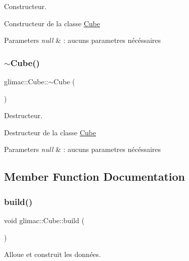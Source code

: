 Constructeur. 

Constructeur de la classe \hyperlink{classglimac_1_1Cube}{Cube}


\begin{DoxyParams}{Parameters}
{\em null} & \+: aucuns parametres nécéssaires \\
\hline
\end{DoxyParams}
\mbox{\label{classglimac_1_1Cube_a52597e45ce6cd2db132f5d198c2bd33b}} 
\subsubsection{\texorpdfstring{$\sim$\+Cube()}{~Cube()}}
{\footnotesize\ttfamily glimac\+::\+Cube\+::$\sim$\+Cube (\begin{DoxyParamCaption}{ }\end{DoxyParamCaption})\hspace{0.3cm}{\ttfamily [inline]}}



Destructeur. 

Destructeur de la classe \hyperlink{classglimac_1_1Cube}{Cube}


\begin{DoxyParams}{Parameters}
{\em null} & \+: aucuns parametres nécéssaires \\
\hline
\end{DoxyParams}


\subsection{Member Function Documentation}
\mbox{\label{classglimac_1_1Cube_a90a46da5252a79df816f3289ff5910f3}} 
\subsubsection{\texorpdfstring{build()}{build()}}
{\footnotesize\ttfamily void glimac\+::\+Cube\+::build (\begin{DoxyParamCaption}{ }\end{DoxyParamCaption})}



Alloue et construit les données. 

